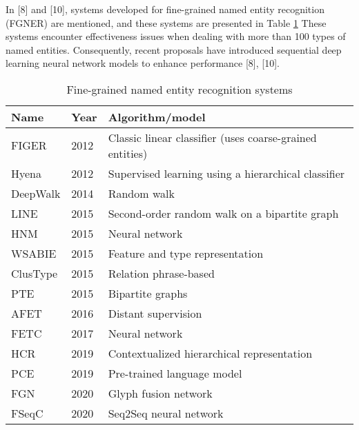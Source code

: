 In [8] and [10], systems developed for fine-grained named entity recognition (FGNER) are mentioned, and these systems are presented in Table \ref{tab:fgner} These systems encounter effectiveness issues when dealing with more than 100 types of named entities. Consequently, recent proposals have introduced sequential deep learning neural network models to enhance performance [8], [10].
\begin{center}
    \begin{table}[h]
        \centering%
        \caption{Fine-grained named entity recognition systems}
        \label{tab:fgner}
        \begin{tabular}{|l|l|l|}
            \hline
            \textbf{Name} & \textbf{Year} & \textbf{Algorithm/model}                                 \\ \hline
            FIGER         & 2012          & Classic linear classifier (uses coarse-grained entities) \\ \hline
            Hyena         & 2012          & Supervised learning using a hierarchical classifier      \\ \hline
            DeepWalk      & 2014          & Random walk                                              \\ \hline
            LINE          & 2015          & Second-order random walk on a bipartite graph            \\ \hline
            HNM           & 2015          & Neural network                                           \\ \hline
            WSABIE        & 2015          & Feature and type representation                          \\ \hline
            ClusType      & 2015          & Relation phrase-based                                    \\ \hline
            PTE           & 2015          & Bipartite graphs                                         \\ \hline
            AFET          & 2016          & Distant supervision                                      \\ \hline
            FETC          & 2017          & Neural network                                           \\ \hline
            HCR           & 2019          & Contextualized hierarchical representation               \\ \hline
            PCE           & 2019          & Pre-trained language model                               \\ \hline
            FGN           & 2020          & Glyph fusion network                                     \\ \hline
            FSeqC         & 2020          & Seq2Seq neural network                                   \\ \hline
        \end{tabular}
    \end{table}
\end{center}

